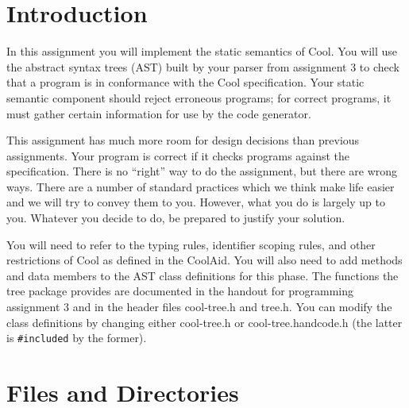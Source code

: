 %
%





%
\def\U#1{{\sf{}#1}}
\def\S#1{{\tt{}#1}} %
\def\C#1{{\bf{}#1}}


\section{Introduction} 

In this assignment you will implement the static semantics of Cool.
You will use the abstract syntax trees (AST) built by
your parser from assignment 3 to check that a program is in conformance
with the Cool specification. Your static semantic
component should reject erroneous programs; for correct programs, it
must gather certain information for use by the code generator.

This assignment has much more room for design
decisions than previous assignments. Your program is correct if it checks
programs against the specification. There is no ``right'' way to do
the assignment, but there are wrong ways. There are a number of
standard practices which we think make life easier and we will try to
convey them to you. However, what you do is largely up to you.
Whatever you decide to do, be prepared to justify your solution.

You will need to refer to the typing rules, identifier scoping rules,
and other restrictions of Cool as defined in the
CoolAid.  You will also need to add methods and data members to the 
AST class definitions for this phase.  The functions
the tree package provides are documented in the handout for programming
assignment 3 and in the header files \U{cool-tree.h} and \U{tree.h}.
You can modify the class definitions by changing either
\U{cool-tree.h} or \U{cool-tree.handcode.h} (the latter is {\tt \#included}
by the former).

\section{Files and Directories}

